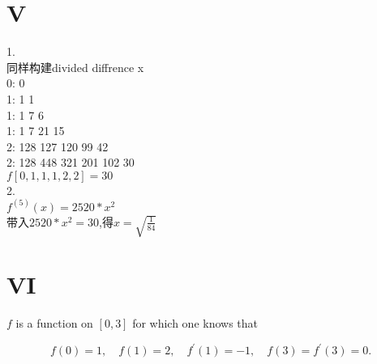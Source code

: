 \documentclass[a4paper]{article}
\begin{document}
\section*{V}
1.\\
同样构建divided diffrence
x\\
0: 0\\
1: 1 1\\
1: 1 7 6\\
1: 1 7 21 15\\
2: 128 127 120 99 42\\
2: 128 448 321 201 102 30\\
$f[0,1,1,1,2,2]=30$\\
2.\\
$f^{(5)}(x)=2520*x^2$\\
带入$2520*x^2=30$,得$x=\sqrt{\frac{1}{84}}$\\



\section*{VI}
$f$ is a function on $[0,3]$ for which one knows that

\[
f(0)=1,\quad f(1)=2,\quad f^{\prime}(1)=-1,\quad f(3)=f^{\prime}(3)=0.
\]
\end{document}

